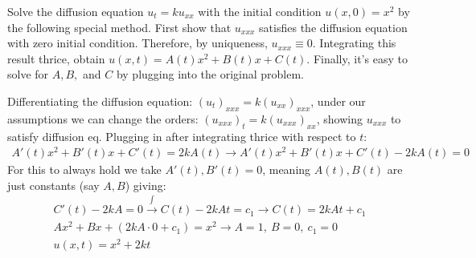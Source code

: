 \newpage
Solve the diffusion equation $u_t = ku_{xx}$ with the initial condition
$u(x, 0) = x^2$ by the following special method. First show that $u_{xxx}$
satisﬁes the diffusion equation with zero initial condition. Therefore, by uniqueness, $u_{xxx} \equiv 0$. Integrating this result thrice, obtain
$u(x, t) = A(t)x^2 + B(t)x + C(t)$. Finally, it’s easy to solve for $A, B,$
and $C$ by plugging into the original problem.

Differentiating the diffusion equation: $(u_t)_{xxx}=k(u_{xx})_{xxx}$, under our assumptions we can change the orders: $(u_{xxx})_t=k(u_{xxx})_{xx}$, showing $u_{xxx}$ to satisfy diffusion eq. Plugging in after integrating thrice with respect to $t$:
\begin{gather*}
	A'(t)x^2+B'(t)x+C'(t)=2kA(t) \stackrel{ }{\longrightarrow} 	A'(t)x^2+B'(t)x+C'(t)-2kA(t)=0 
\end{gather*}
For this to always hold we take $A'(t),B'(t)=0$, meaning $A(t),B(t)$ are just constants (say $A,B$) giving:
\begin{gather*}
	C'(t)-2kA=0 \stackrel{ \int }{\longrightarrow} C(t)-2kAt=c_1 \stackrel{ }{\longrightarrow} C(t)=2kAt+c_1\\
	Ax^2+Bx+(2kA\cdot 0+c_1)=x^2 \stackrel{ }{\longrightarrow} A=1,\ B=0,\ c_1=0\\
	u(x,t)=x^2+2kt
\end{gather*}
